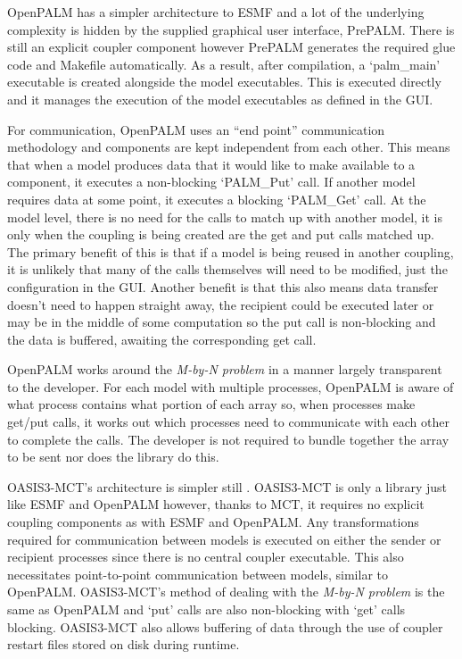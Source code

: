 OpenPALM has a simpler architecture to ESMF and a lot of the underlying
complexity is hidden by the supplied graphical user interface, PrePALM. There is
still an explicit coupler component however PrePALM generates the required glue
code and Makefile automatically. As a result, after compilation, a `palm\_main'
executable is created alongside the model executables. This is executed directly
and it manages the execution of the model executables as defined in the GUI.

For communication, OpenPALM uses an ``end point'' communication methodology
\cite{CERFACS2007} and components are kept independent from each other. This
means that when a model produces data that it would like to make available to a
component, it executes a non-blocking `PALM\_Put' call. If another model
requires data at some point, it executes a blocking `PALM\_Get' call. At the
model level, there is no need for the calls to match up with another model, it
is only when the coupling is being created are the get and put calls matched up.
The primary benefit of this is that if a model is being reused in another
coupling, it is unlikely that many of the calls themselves will need to be
modified, just the configuration in the GUI. Another benefit is that this also
means data transfer doesn't need to happen straight away, the recipient could be
executed later or may be in the middle of some computation so the put call is
non-blocking and the data is buffered, awaiting the corresponding get call.

OpenPALM works around the \textit{M-by-N problem} in a manner largely
transparent to the developer. For each model with multiple processes, OpenPALM
is aware of what process contains what portion of each array so, when processes
make get/put calls, it works out which processes need to communicate with each
other to complete the calls. The developer is not required to bundle together
the array to be sent nor does the library do this.

OASIS3-MCT's architecture is simpler still \cite{OASIS3-MCT2013}. OASIS3-MCT is
only a library just like ESMF and OpenPALM however, thanks to MCT, it requires
no explicit coupling components as with ESMF and OpenPALM. Any transformations
required for communication between models is executed on either the sender or
recipient processes since there is no central coupler executable. This also
necessitates point-to-point communication between models, similar to OpenPALM.
OASIS3-MCT's method of dealing with the \textit{M-by-N problem} is the same as
OpenPALM and `put' calls are also non-blocking with `get' calls blocking.
OASIS3-MCT also allows buffering of data through the use of coupler restart
files stored on disk during runtime.

